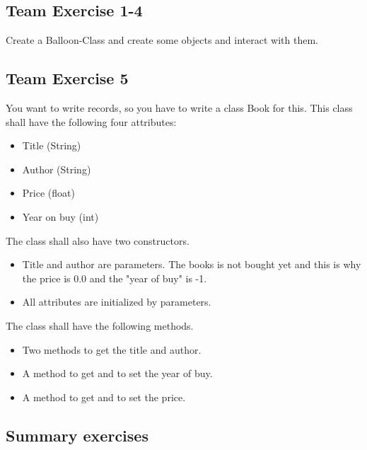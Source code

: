 \newpage
\subsection{Team Exercise 1-4}
Create a Balloon-Class and create some objects and interact with them.



\newpage
\subsection{Team Exercise 5}
You want to write records, so you have to write a class Book for this.
This class shall have the following four attributes:
\begin{itemize}
	\item Title (String)
	\item Author (String)
	\item Price (float)
	\item Year on buy (int)
\end{itemize}

\noindent
The class shall also have two constructors.
\begin{itemize}
	\item Title and author are parameters. The books is not bought yet and
		this is why the price is 0.0 and the "year of buy" is -1.
	\item All attributes are initialized by parameters.
\end{itemize}

\noindent
The class shall have the following methods.
\begin{itemize}
	\item Two methods to get the title and author.
	\item A method to get and to set the year of buy.
	\item A method to get and to set the price.
\end{itemize}







\subsection{Summary exercises}

